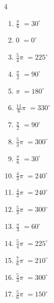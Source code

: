 \begin{multicols}{4}
\begin{enumerate}
  \item $\displaystyle \frac{\pi}{6}$
        $\displaystyle =30^{\circ}$

  \item $\displaystyle 0$
        $\displaystyle =0^{\circ}$

  \item $\displaystyle \frac{5}{4}\pi$
        $\displaystyle =225^{\circ}$

  \item $\displaystyle \frac{\pi}{2}$
        $\displaystyle =90^{\circ}$

\columnbreak %

\resetques

  \item $\displaystyle \pi$
        $\displaystyle =180^{\circ}$

  \item $\displaystyle \frac{11}{6}\pi$
        $\displaystyle =330^{\circ}$

  \item $\displaystyle \frac{\pi}{2}$
        $\displaystyle =90^{\circ}$

  \item $\displaystyle \frac{5}{3}\pi$
        $\displaystyle =300^{\circ}$

  \item $\displaystyle \frac{\pi}{6}$
        $\displaystyle =30^{\circ}$

  \item $\displaystyle \frac{4}{3}\pi$
        $\displaystyle =240^{\circ}$

  \item $\displaystyle \frac{4}{3}\pi$
        $\displaystyle =240^{\circ}$

  \item $\displaystyle \frac{5}{3}\pi$
        $\displaystyle =300^{\circ}$

  \item $\displaystyle \frac{\pi}{3}$
        $\displaystyle =60^{\circ}$

  \item $\displaystyle \frac{5}{4}\pi$
        $\displaystyle =225^{\circ}$

  \item $\displaystyle \frac{7}{6}\pi$
        $\displaystyle =210^{\circ}$

  \item $\displaystyle \frac{5}{3}\pi$
        $\displaystyle =300^{\circ}$

  \item $\displaystyle \frac{5}{6}\pi$
        $\displaystyle =150^{\circ}$


\end{enumerate}
\end{multicols}
